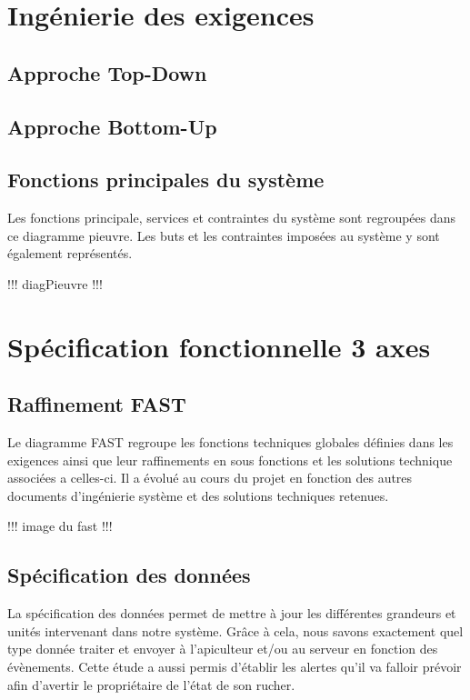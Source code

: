 \chapter{Ingénierie des exigences}
\section{Approche Top-Down}
\label{sec:top-down}

\section{Approche Bottom-Up}

\section{Fonctions principales du système}

Les fonctions principale, services et contraintes du système sont regroupées dans ce diagramme pieuvre. Les buts et les contraintes imposées au système y sont également représentés. 
 
!!!  diagPieuvre  !!!

\chapter{Spécification fonctionnelle  3 axes}

\section{Raffinement FAST}
Le diagramme FAST regroupe les fonctions techniques globales définies dans les 
exigences ainsi que leur raffinements en sous fonctions et les solutions technique 
associées a celles-ci. Il a évolué au cours du projet en fonction des autres documents 
d'ingénierie système et des solutions techniques retenues. 

!!!  image du fast  !!!

\section{Spécification des données}
La spécification des données permet de mettre à jour les différentes grandeurs 
et unités intervenant dans notre système. Grâce à cela, nous savons exactement 
quel type donnée traiter et envoyer à l'apiculteur et/ou au serveur en fonction des évènements. Cette étude a aussi permis d'établir les alertes qu'il va falloir prévoir afin d'avertir le propriétaire de l'état de son rucher. 

